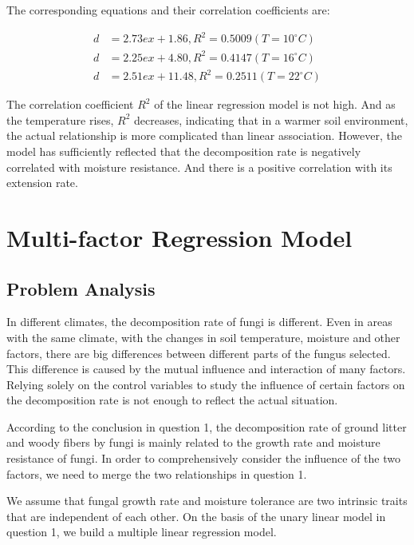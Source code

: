 \documentclass{mcmthesis}
\begin{document}
The corresponding equations and their correlation coefficients are: 

\begin{equation}
  \begin{split}
    d&=2.73ex+1.86,R^2=0.5009 (T=10^{\circ}C) \\
    d&=2.25ex+4.80,R^2=0.4147 (T=16^{\circ}C) \\
    d&=2.51ex+11.48,R^2=0.2511 (T=22^{\circ}C)
  \end{split}
\end{equation}

The correlation coefficient $ R^{2} $ of the linear regression model is not high. And as the temperature rises, $ R^{2} $ decreases, indicating that in a warmer soil environment, the actual relationship is more complicated than linear association. However, the model has sufficiently reflected that the decomposition rate is negatively correlated with moisture resistance. And there is a positive correlation with its extension rate.

\section{Multi-factor Regression Model}

\subsection{Problem Analysis}

In different climates, the decomposition rate of fungi is different. Even in areas with the same climate, with the changes in soil temperature, moisture and other factors, there are big differences between different parts of the fungus selected. This difference is caused by the mutual influence and interaction of many factors. Relying solely on the control variables to study the influence of certain factors on the decomposition rate is not enough to reflect the actual situation. 

According to the conclusion in question 1, the decomposition rate of ground litter and woody fibers by fungi is mainly related to the growth rate and moisture resistance of fungi. In order to comprehensively consider the influence of the two factors, we need to merge the two relationships in question 1. 

We assume that fungal growth rate and moisture tolerance are two intrinsic traits that are independent of each other. On the basis of the unary linear model in question 1, we build a multiple linear regression model. 
\end{document}
